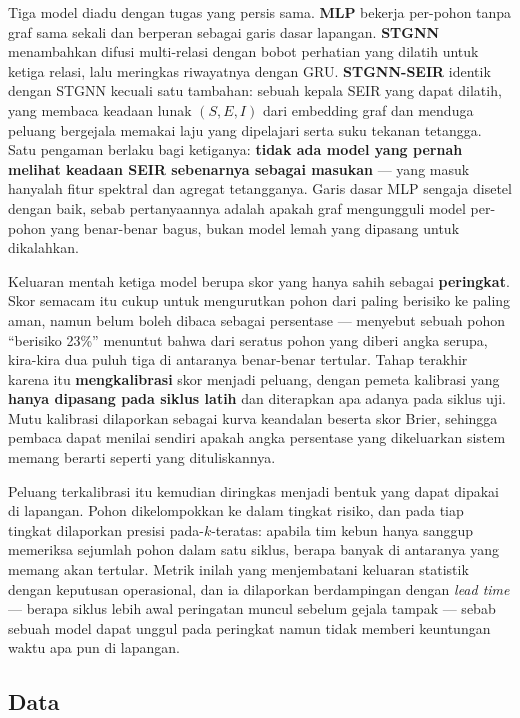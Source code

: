 Tiga model diadu dengan tugas yang persis sama. \textbf{MLP} bekerja per-pohon tanpa graf
sama sekali dan berperan sebagai garis dasar lapangan. \textbf{STGNN} menambahkan difusi
multi-relasi dengan bobot perhatian yang dilatih untuk ketiga relasi, lalu meringkas
riwayatnya dengan GRU. \textbf{STGNN-SEIR} identik dengan STGNN kecuali satu tambahan:
sebuah kepala SEIR yang dapat dilatih, yang membaca keadaan lunak $(S,E,I)$ dari embedding
graf dan menduga peluang bergejala memakai laju yang dipelajari serta suku tekanan
tetangga. Satu pengaman berlaku bagi ketiganya: \textbf{tidak ada model yang pernah
melihat keadaan SEIR sebenarnya sebagai masukan} --- yang masuk hanyalah fitur spektral
dan agregat tetangganya. Garis dasar MLP sengaja disetel dengan baik, sebab pertanyaannya
adalah apakah graf mengungguli model per-pohon yang benar-benar bagus, bukan model lemah
yang dipasang untuk dikalahkan.

Keluaran mentah ketiga model berupa skor yang hanya sahih sebagai \textbf{peringkat}.
Skor semacam itu cukup untuk mengurutkan pohon dari paling berisiko ke paling aman, namun
belum boleh dibaca sebagai persentase --- menyebut sebuah pohon ``berisiko 23\%'' menuntut
bahwa dari seratus pohon yang diberi angka serupa, kira-kira dua puluh tiga di antaranya
benar-benar tertular. Tahap terakhir karena itu \textbf{mengkalibrasi} skor menjadi
peluang, dengan pemeta kalibrasi yang \textbf{hanya dipasang pada siklus latih} dan
diterapkan apa adanya pada siklus uji. Mutu kalibrasi dilaporkan sebagai kurva keandalan
beserta skor Brier, sehingga pembaca dapat menilai sendiri apakah angka persentase yang
dikeluarkan sistem memang berarti seperti yang dituliskannya.

Peluang terkalibrasi itu kemudian diringkas menjadi bentuk yang dapat dipakai di lapangan.
Pohon dikelompokkan ke dalam tingkat risiko, dan pada tiap tingkat dilaporkan presisi
pada-$k$-teratas: apabila tim kebun hanya sanggup memeriksa sejumlah pohon dalam satu
siklus, berapa banyak di antaranya yang memang akan tertular. Metrik inilah yang
menjembatani keluaran statistik dengan keputusan operasional, dan ia dilaporkan
berdampingan dengan \textit{lead time} --- berapa siklus lebih awal peringatan muncul
sebelum gejala tampak --- sebab sebuah model dapat unggul pada peringkat namun tidak
memberi keuntungan waktu apa pun di lapangan.

\subsection{Data}

